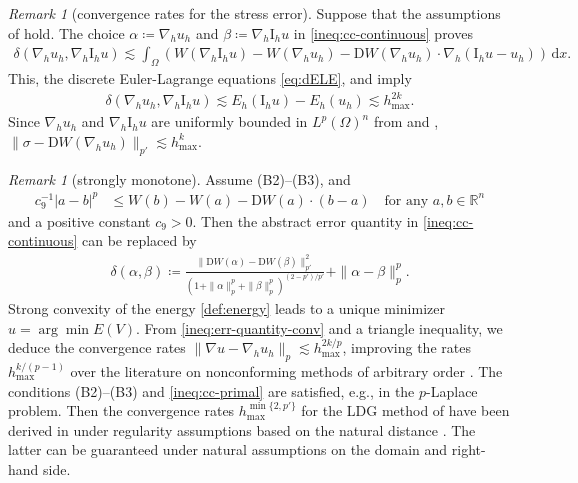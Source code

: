 \documentclass[a4paper]{amsart}
\numberwithin{equation}{section}
\renewcommand{\d}[1]{\,\mathrm{d}#1}
\newcommand{\I}{\mathrm{I}}
\newcommand{\D}{\mathrm{D}}
\theoremstyle{remark}
\newtheorem{remark}[theorem]{Remark}
\begin{document}
\begin{remark}[convergence rates for the stress error]
	Suppose that the assumptions of  hold.
	The choice $\alpha \coloneqq \nabla_h u_h$ and $\beta \coloneqq \nabla_h \mathrm{I}_h u$ in \eqref{ineq:cc-continuous} proves
	\begin{align*}
		\delta(\nabla_h u_h,\nabla_h \mathrm{I}_h u) \lesssim \int_\Omega (W(\nabla_h \mathrm{I}_h u) - W(\nabla_h u_h) - \D W(\nabla_h u_h) \cdot \nabla_h(\mathrm{I}_h u - u_h)) \d{x}.
	\end{align*}
	This, the discrete Euler-Lagrange equations \eqref{eq:dELE}, and  imply
	\begin{align}\label{ineq:err-quantity-conv}
		 \delta(\nabla_h u_h,\nabla_h \mathrm{I}_h u) \lesssim E_h(\mathrm{I}_h u) - E_h(u_h) \lesssim h_{\mathrm{max}}^{2k}.
	\end{align}
	Since $\nabla_h u_h$ and $\nabla_h \I_h u$ are uniformly bounded in $L^{p}(\Omega)^n$ from  and , $\|\sigma - \D W(\nabla_h u_h)\|_{p'} \lesssim h_{\max}^k$.
\end{remark}
\begin{remark}[strongly monotone]
	Assume (B2)--(B3), and
	\begin{align}
		c_9^{-1}|a - b|^p &\leq W(b) - W(a) - \D W(a) \cdot (b - a) \quad\text{for any } a,b \in \mathbb{R}^n\label{ineq:cc-primal}
	\end{align}
    and a positive constant $c_9 > 0$.
	Then the abstract error quantity in \eqref{ineq:cc-continuous} can be replaced by
	\begin{align*}
		\delta(\alpha,\beta) \coloneqq \frac{\|\D W(\alpha) - \D W(\beta)\|_{p'}^2}{(1 + \|\alpha\|^p_{p} + \|\beta\|_{p}^p)^{(2-p')/p'}} + \|\alpha - \beta\|_p^p.
	\end{align*}
	Strong convexity of the energy \eqref{def:energy} leads to a unique minimizer $u = \arg\min E(V)$.
	From \eqref{ineq:err-quantity-conv} and a triangle inequality, we deduce the convergence rates $\|\nabla u - \nabla_h u_h\|_p \lesssim h_{\max}^{2k/p}$, improving the rates $h_{\max}^{k/(p-1)}$ over the literature on nonconforming methods of arbitrary order \cite{DiPietroDroniou2017-II,DroniouEymardGallouet2018}.
	The conditions (B2)--(B3) and \eqref{ineq:cc-primal} are satisfied, e.g., in the $p$-Laplace problem.
    Then the convergence rates $h_{\max}^{\min\{2,p'\}}$ for the LDG method of \cite{BurmanErn2008} have been derived in \cite{LDG2014} under regularity assumptions based on the natural distance \cite{EbmeyerLiuSteinhauer2005}. The latter can be guaranteed under natural assumptions on the domain and right-hand side.
\end{remark} 
\end{document}
